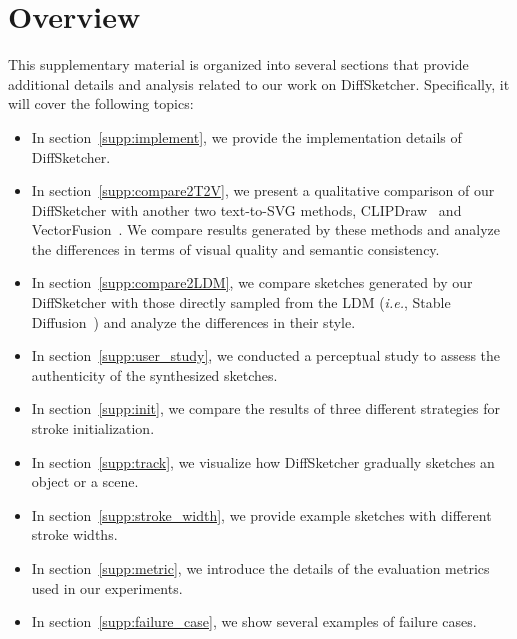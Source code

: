 \documentclass{article}
\begin{document}
\section*{Overview}
This supplementary material is organized into several sections that provide additional details and analysis related to our work on DiffSketcher. Specifically, it will cover the following topics:
\begin{itemize}
\item In section~\ref{supp:implement}, we provide the implementation details of DiffSketcher.
\item In section~\ref{supp:compare2T2V}, we present a qualitative comparison of our DiffSketcher with another two text-to-SVG methods, CLIPDraw~\cite{clipdraw_frans_2022} and VectorFusion~\cite{jain2022vectorfusion}. We compare results generated by these methods and analyze the differences in terms of visual quality and semantic consistency.
\item In section~\ref{supp:compare2LDM}, we compare sketches generated by our DiffSketcher with those directly sampled from the LDM (\textit{i.e.}, Stable Diffusion~\cite{ldm_2022_Rombach}) and analyze the differences in their style.
\item In section~\ref{supp:user_study}, we conducted a perceptual study to assess the authenticity of the synthesized sketches.
\item In section~\ref{supp:init}, we compare the results of three different strategies for stroke initialization.
\item In section~\ref{supp:track}, we visualize how DiffSketcher gradually sketches an object or a scene. 
\item In section~\ref{supp:stroke_width}, we provide example sketches with different stroke widths.
\item In section~\ref{supp:metric}, we introduce the details of the evaluation metrics used in our experiments.
\item In section~\ref{supp:failure_case}, we show several examples of failure cases.
\end{itemize}
\end{document}
